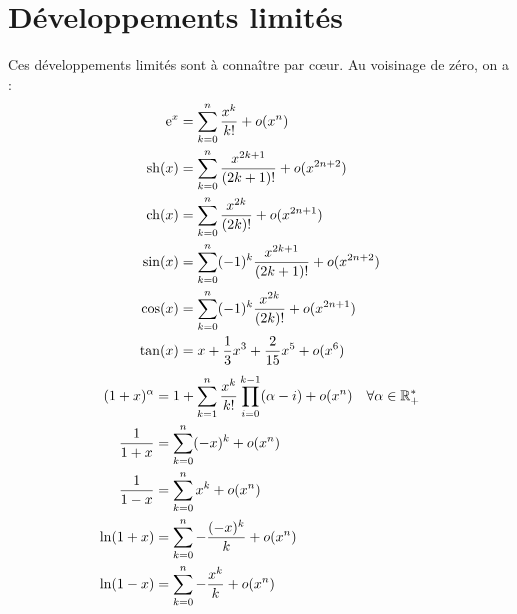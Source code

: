 \chapter{Développements limités} %

Ces développements limités sont à connaître par c\oe{}ur. Au voisinage de zéro, on a :
\begin{align}
  \e^x &= \sum_{k=0}^n \frac{x^k}{k!} + o(x^n) \\%
  \hsin(x) &= \sum_{k=0}^n \frac{x^{2k+1}}{(2k+1)!} + o(x^{2n+2}) \\%
  \hcos(x) &= \sum_{k=0}^n \frac{x^{2k}}{(2k)!} + o(x^{2n+1}) \\%
  \sin(x)  &= \sum_{k=0}^n (-1)^k\frac{x^{2k+1}}{(2k+1)!} + o(x^{2n+2}) \\%
  \cos(x)  &= \sum_{k=0}^n (-1)^k\frac{x^{2k}}{(2k)!} + o(x^{2n+1}) \\%
  \tan(x)  &= x + \frac{1}{3} x^3 + \frac{2}{15} x^5  + o(x^6)
\end{align}
\begin{align}
  (1+x)^\alpha & = 1 + \sum_{k=1}^n \frac{x^k}{k!} \prod_{i=0}^{k-1} (\alpha -i) + o(x^n) \quad \forall \alpha \in \R^*_+ \\%
  \frac{1}{1+x} &= \sum_{k=0}^n (-x)^k +o(x^n) \\%
  \frac{1}{1-x} &= \sum_{k=0}^n  x^k +o(x^n) \\%
  \ln(1+x)&= \sum_{k=0}^n -\frac{(-x)^k}{k} +o(x^n) \\%
  \ln(1-x)&= \sum_{k=0}^n -\frac{x^k}{k} +o(x^n) %
\end{align}

